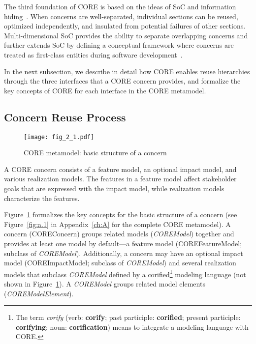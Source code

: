 The third foundation of CORE is based on the ideas of SoC and information hiding~\cite{dijkstra1976discipline, parnas1972criteria}. When concerns are well-separated, individual sections can be reused, optimized independently, and insulated from potential failures of other sections. Multi-dimensional SoC provides the ability to separate overlapping concerns and further extends SoC by defining a conceptual framework where concerns are treated as first-class entities during software development~\cite{tarr1999n}.

In the next subsection, we describe in detail how CORE enables reuse hierarchies through the three interfaces that a CORE concern provides, and formalize the key concepts of CORE for each interface in the CORE metamodel.

\subsection{Concern Reuse Process}

\begin{figure}
	\centering
	\texttt{[image: fig\_2\_1.pdf]}
	\caption{CORE metamodel: basic structure of a concern}
	\label{fig:2.1}
\end{figure}

A CORE concern consists of a feature model, an optional impact model, and various realization models. The features in a feature model affect stakeholder goals that are expressed with the impact model, while realization models characterize the features.

Figure~\ref{fig:2.1} formalizes the key concepts for the basic structure of a concern (see Figure~\ref{fig:a.1} in Appendix~\ref{ch:A} for the complete CORE metamodel). A concern ({\cls COREConcern}) groups related models (\textit{\cls COREModel}) together and provides at least one model by default---a feature model ({\cls COREFeatureModel}; subclass of \textit{\cls COREModel}). Additionally, a concern may have an optional impact model ({\cls COREImpactModel}; subclass of \textit{\cls COREModel}) and several realization models that subclass \textit{\cls COREModel} defined by a corified\footnote{The term \emph{corify} (verb: \textbf{corify}; past participle: \textbf{corified}; present participle: \textbf{corifying}; noun: \textbf{corification}) means to integrate a modeling language with CORE.} modeling language (not shown in Figure~\ref{fig:2.1}). A \textit{\cls COREModel} groups related model elements (\textit{\cls COREModelElement}).

